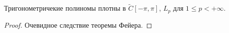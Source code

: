 \begin{corollary}
    Тригонометричекие полиномы плотны в $\widetilde{C}[-\pi, \pi]$, $L_p$ для
    $1 \leqslant p < +\infty$.
\end{corollary}
\begin{proof}
    Очевидное следствие теоремы Фейера.
\end{proof}

